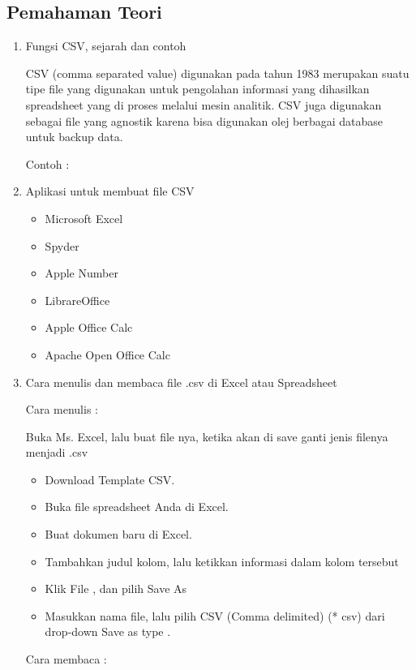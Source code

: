 \subsection{Pemahaman Teori}
\begin{enumerate}
\item Fungsi CSV, sejarah dan contoh

CSV (comma separated value) digunakan pada tahun 1983 merupakan suatu tipe file yang digunakan untuk pengolahan informasi yang dihasilkan spreadsheet yang di proses melalui mesin analitik. CSV juga digunakan sebagai file yang agnostik karena bisa digunakan olej berbagai database untuk backup data.

Contoh :



\item Aplikasi untuk membuat file CSV

\begin{itemize}
\item Microsoft Excel
\item Spyder
\item Apple Number
\item LibrareOffice
\item Apple Office Calc
\item Apache Open Office Calc

\end{itemize}

\item Cara menulis dan membaca file .csv di Excel atau Spreadsheet

Cara menulis :

Buka Ms. Excel, lalu buat file nya, ketika akan di save ganti jenis filenya menjadi .csv
\begin{itemize}
\item Download Template CSV.
\item Buka file spreadsheet Anda di Excel. 
\item Buat dokumen baru di Excel.
\item Tambahkan judul kolom, lalu ketikkan informasi dalam kolom tersebut
\item Klik File , dan pilih Save As 
\item Masukkan nama file, lalu pilih CSV (Comma delimited) (* csv) dari drop-down Save as type .
\end{itemize}


Cara membaca :


\end{enumerate}
